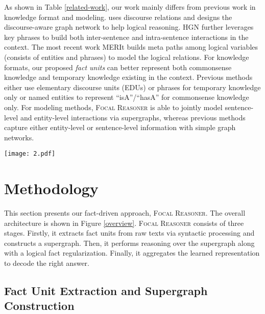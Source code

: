 \documentclass[11pt]{article}
\begin{document}
As shown in Table \ref{related-work}, our work mainly differs from previous work in knowledge format and modeling. \citet{zhang2021video} uses discourse relations and designs the discourse-aware graph network to help logical reasoning. HGN \cite{chen-etal-2022-modeling-hierarchical} further leverages key phrases to build both inter-sentence and intra-sentence interactions in the context. The most recent work MERIt \cite{jiao2022merit} builds meta paths among logical variables (consists of entities and phrases) to model the logical relations. For knowledge formats, our proposed \textit{fact units} can better represent both commonsense knowledge and temporary knowledge existing in the context. Previous methods either use elementary discourse units (EDUs) or phrases for temporary knowledge only or named entities to represent ``isA''/``hasA'' for commonsense knowledge only. For modeling methods, \textsc{Focal Reasoner} is able to jointly model sentence-level and entity-level interactions via supergraphs, whereas previous methods capture either entity-level or sentence-level information with simple graph networks. 





\begin{figure*}
\vspace{-3 mm}
\centering
\texttt{[image: 2.pdf]}
\caption{The framework or our model. For supergraph reasoning, in each iteration, each node selectively receives the message from the neighboring nodes to update its representation. The dashed circle means zero vector.}
\label{overview}
\vspace{-3 mm}
\end{figure*}


\section{Methodology}
\label{headings}

This section presents our fact-driven approach, \textsc{Focal Reasoner}. The overall architecture is shown in Figure \ref{overview}. \textsc{Focal Reasoner} consists of three stages. Firstly, it extracts fact units from raw texts via syntactic processing and constructs a supergraph. Then, it performs reasoning over the supergraph along with a logical fact regularization. Finally, it aggregates the learned representation to decode the right answer.




\subsection{Fact Unit Extraction and Supergraph Construction}
\label{preprocessing}
\end{document}
